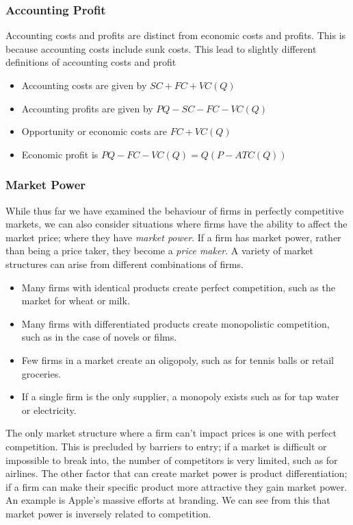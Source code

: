 \documentclass[12pt]{report}
\begin{document}
\begin{flushleft}
\subsubsection*{Accounting Profit}
Accounting costs and profits are distinct from economic costs and profits. This
is because accounting costs include sunk costs. This lead to slightly different
definitions of accounting costs and profit
\begin{itemize}
    \item Accounting costs are given by \(SC + FC + VC(Q)\)
    \item Accounting profits are given by \(PQ - SC - FC - VC(Q)\)
    \item Opportunity or economic costs are \(FC + VC(Q)\)
    \item Economic profit is \(PQ - FC - VC(Q) = Q(P - ATC(Q))\)
\end{itemize}

\subsubsection*{Market Power}
While thus far we have examined the behaviour of firms in perfectly competitive
markets, we can also consider situations where firms have the ability to affect
the market price; where they have \textit{market power}. If a firm has market
power, rather than being a price taker, they become a \textit{price maker}.
A variety of market structures can arise from different combinations of firms.

\begin{itemize}
    \item Many firms with identical products create perfect competition, such
    as the market for wheat or milk.
    \item Many firms with differentiated products create monopolistic 
    competition, such as in the case of novels or films.
    \item Few firms in a market create an oligopoly, such as for tennis balls
    or retail groceries.
    \item If a single firm is the only supplier, a monopoly exists such as for
    tap water or electricity. 
\end{itemize}

The only market structure where a firm can't impact prices is one with perfect
competition. This is precluded by barriers to entry; if a market is difficult 
or impossible to break into, the number of competitors is very limited, such as
for airlines. The other factor that can create market power is product 
differentiation; if a firm can make their specific product more attractive they
gain market power. An example is Apple's massive efforts at branding. We can
see from this that market power is inversely related to competition.


\end{flushleft}
\end{document}
